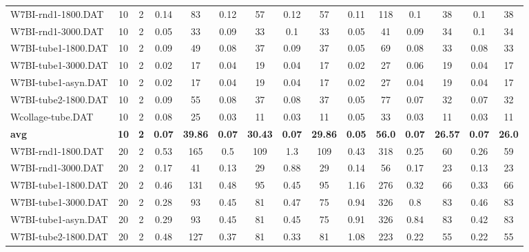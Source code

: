 \begin{table}[!ht]
{\begin{tabular}{lcccccccccccccc}
W7BI-rnd1-1800.DAT & 10 & 2 & 0.14 & 83 & 0.12 & 57 & 0.12 & 57 & 0.11 & 118 &  \textcolor{blue2}{0.1} & 38 &  \textcolor{blue2}{0.1} & 38 \\
W7BI-rnd1-3000.DAT & 10 & 2 &  \textcolor{blue2}{0.05} & 33 & 0.09 & 33 & 0.1 & 33 &  \textcolor{blue2}{0.05} & 41 & 0.09 & 34 & 0.1 & 34 \\
W7BI-tube1-1800.DAT & 10 & 2 & 0.09 & 49 & 0.08 & 37 & 0.09 & 37 &  \textcolor{blue2}{0.05} & 69 & 0.08 & 33 & 0.08 & 33 \\
W7BI-tube1-3000.DAT & 10 & 2 &  \textcolor{blue2}{0.02} & 17 & 0.04 & 19 & 0.04 & 17 &  \textcolor{blue2}{0.02} & 27 & 0.06 & 19 & 0.04 & 17 \\
W7BI-tube1-asyn.DAT & 10 & 2 &  \textcolor{blue2}{0.02} & 17 & 0.04 & 19 & 0.04 & 17 &  \textcolor{blue2}{0.02} & 27 & 0.04 & 19 & 0.04 & 17 \\
W7BI-tube2-1800.DAT & 10 & 2 & 0.09 & 55 & 0.08 & 37 & 0.08 & 37 &  \textcolor{blue2}{0.05} & 77 & 0.07 & 32 & 0.07 & 32 \\
Wcollage-tube.DAT & 10 & 2 & 0.08 & 25 &  \textcolor{blue2}{0.03} & 11 &  \textcolor{blue2}{0.03} & 11 & 0.05 & 33 &  \textcolor{blue2}{0.03} & 11 &  \textcolor{blue2}{0.03} & 11 \\
\cline{1-15} \textbf{avg} & \textbf{10} & \textbf{2} & \textbf{0.07} & \textbf{39.86} & \textbf{0.07} & \textbf{30.43} & \textbf{0.07} & \textbf{29.86} & \textbf{0.05} & \textbf{56.0} & \textbf{0.07} & \textbf{26.57} & \textbf{0.07} & \textbf{26.0} \\ \cline{1-15}
W7BI-rnd1-1800.DAT & 20 & 2 & 0.53 & 165 & 0.5 & 109 & 1.3 & 109 & 0.43 & 318 &  \textcolor{blue2}{0.25} & 60 & 0.26 & 59 \\
W7BI-rnd1-3000.DAT & 20 & 2 & 0.17 & 41 &  \textcolor{blue2}{0.13} & 29 & 0.88 & 29 & 0.14 & 56 & 0.17 & 23 &  \textcolor{blue2}{0.13} & 23 \\
W7BI-tube1-1800.DAT & 20 & 2 & 0.46 & 131 & 0.48 & 95 & 0.45 & 95 & 1.16 & 276 &  \textcolor{blue2}{0.32} & 66 & 0.33 & 66 \\
W7BI-tube1-3000.DAT & 20 & 2 &  \textcolor{blue2}{0.28} & 93 & 0.45 & 81 & 0.47 & 75 & 0.94 & 326 & 0.8 & 83 & 0.46 & 83 \\
W7BI-tube1-asyn.DAT & 20 & 2 &  \textcolor{blue2}{0.29} & 93 & 0.45 & 81 & 0.45 & 75 & 0.91 & 326 & 0.84 & 83 & 0.42 & 83 \\
W7BI-tube2-1800.DAT & 20 & 2 & 0.48 & 127 & 0.37 & 81 & 0.33 & 81 & 1.08 & 223 &  \textcolor{blue2}{0.22} & 55 &  \textcolor{blue2}{0.22} & 55 \\

\end{tabular}}
\end{table}
